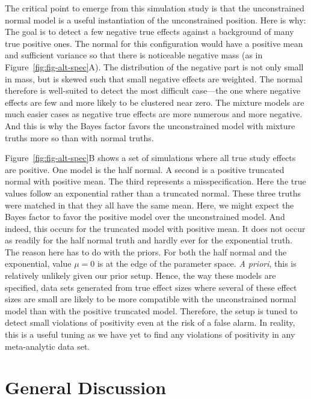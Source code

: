 \documentclass[english,man]{apa6}
\theoremstyle{definition}
\theoremstyle{definition}
\theoremstyle{remark}
\begin{document}
The critical point to emerge from this simulation study is that the
unconstrained normal model is a useful instantiation of the
unconstrained position. Here is why: The goal is to detect a few
negative true effects against a background of many true positive ones.
The normal for this configuration would have a positive mean and
sufficient variance so that there is noticeable negative mass (as in
Figure~\ref{fig:fig-alt-spec}A). The distribution of the negative part
is not only small in mass, but is skewed such that small negative
effects are weighted. The normal therefore is well-suited to detect the
most difficult case---the one where negative effects are few and more
likely to be clustered near zero. The mixture models are much easier
cases as negative true effects are more numerous and more negative. And
this is why the Bayes factor favors the unconstrained model with mixture
truths more so than with normal truths.

Figure~\ref{fig:fig-alt-spec}B shows a set of simulations where all true
study effects are positive. One model is the half normal. A second is a
positive truncated normal with positive mean. The third represents a
misspecification. Here the true values follow an exponential rather than
a truncated normal. These three truths were matched in that they all
have the same mean. Here, we might expect the Bayes factor to favor the
positive model over the unconstrained model. And indeed, this occurs for
the truncated model with positive mean. It does not occur as readily for
the half normal truth and hardly ever for the exponential truth. The
reason here has to do with the priors. For both the half normal and the
exponential, value \(\mu=0\) is at the edge of the parameter space.
\emph{A priori}, this is relatively unlikely given our prior setup.
Hence, the way these models are specified, data sets generated from true
effect sizes where several of these effect sizes are small are likely to
be more compatible with the unconstrained normal model than with the
positive truncated model. Therefore, the setup is tuned to detect small
violations of positivity even at the risk of a false alarm. In reality,
this is a useful tuning as we have yet to find any violations of
positivity in any meta-analytic data set.

\section{General Discussion}\label{general-discussion}
\end{document}

